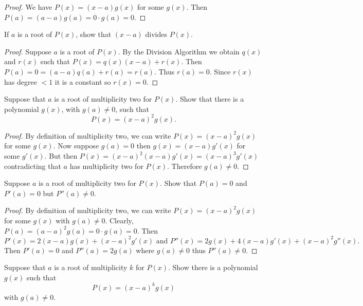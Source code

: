 \begin{proof}
    We have $P(x) = (x - a)g(x)$ for some $g(x)$.
    Then $P(a) = (a - a)g(a) = 0 \cdot g(a) = 0$.
\end{proof}

\begin{tcolorbox}[title=Problem 2, breakable]
    If $a$ is a root of $P(x)$, show that $(x - a)$ divides 
    $P(x)$.
\end{tcolorbox}

\begin{proof}
    Suppose $a$ is a root of $P(x)$.
    By the Division Algorithm we obtain $q(x)$ and $r(x)$
    such that $P(x) = q(x)(x - a) + r(x)$.
    Then $P(a) = 0 = (a - a)q(a) + r(a) = r(a)$.
    Thus $r(a) = 0$. Since $r(x)$ has degree $<1$ it is a constant so $r(x) = 0$.
\end{proof}

\begin{tcolorbox}[title=Problem 3, breakable]
    Suppose that $a$ is a root of multiplicity two for $P(x)$.
    Show that there is a polynomial $g(x)$, with $g(a) \ne 0$,
    such that 
    \[P(x) = (x - a)^2 g(x).\]
\end{tcolorbox}

\begin{proof}
    By definition of multiplicity two, we can write $P(x) = (x - a)^2g(x)$ for some $g(x)$.
    Now suppose $g(a) = 0$ then $g(x) = (x - a)g'(x)$ for some $g'(x)$.
    But then $P(x) = (x - a)^2(x - a)g'(x) = (x - a)^3g'(x)$ contradicting 
    that $a$ has multiplicity two for $P(x)$.
    Therefore $g(a) \ne 0$.
\end{proof}

\begin{tcolorbox}[title=Problem 4, breakable]
    Suppose $a$ is a root of multiplicity two for $P(x)$.
    Show that $P(a) = 0$ and $P'(a) = 0$ but $P''(a) \ne 0$.
\end{tcolorbox}

\begin{proof}
    By definition of multiplicity two, we can write $P(x) = (x - a)^2g(x)$ for some $g(x)$ with $g(a) \ne 0$.
    Clearly, $P(a) = (a - a)^2g(a) = 0 \cdot g(a) = 0$.
    Then 
    \[P'(x) = 2(x - a)g(x) + (x - a)^2g'(x) \text{ and } P''(x) = 2g(x) + 4(x - a)g'(x) + (x - a)^2 g''(x).\]
    Then $P'(a) = 0$ and $P''(a) = 2 g(a)$ where $g(a) \ne 0$ thus $P''(a) \ne 0$.
\end{proof}

\begin{tcolorbox}[title=Problem 5, breakable]
    Suppose that $a$ is a root of multiplicity $k$ for $P(x)$.
    Show there is a polynomial $g(x)$ such that
    \[P(x) = (x - a)^kg(x)\]
    with $g(a) \ne 0$.
\end{tcolorbox}


